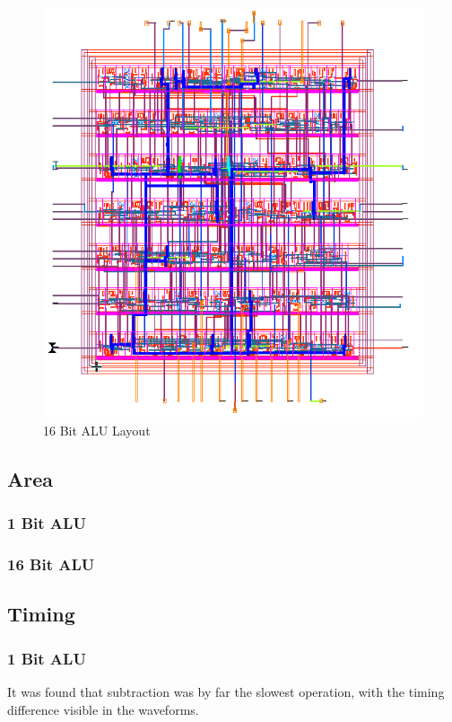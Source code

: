 \documentclass[11pt]{article}
\begin{document}
			\begin{figure}[H]
				\centering
				\includegraphics[width=0.7\linewidth]{"Pictures/ALU-16Bit Layout"}
				\caption{16 Bit ALU Layout}
				\label{fig:alu-16bit-layout}
			\end{figure}
	
	\subsection{Area}
	
		\subsubsection{1 Bit ALU}
	
		\subsubsection{16 Bit ALU}
	
	\subsection{Timing}
	
		\subsubsection{1 Bit ALU}
			It was found that subtraction was by far the slowest operation, with the timing difference visible in the waveforms.  
		
\end{document}
